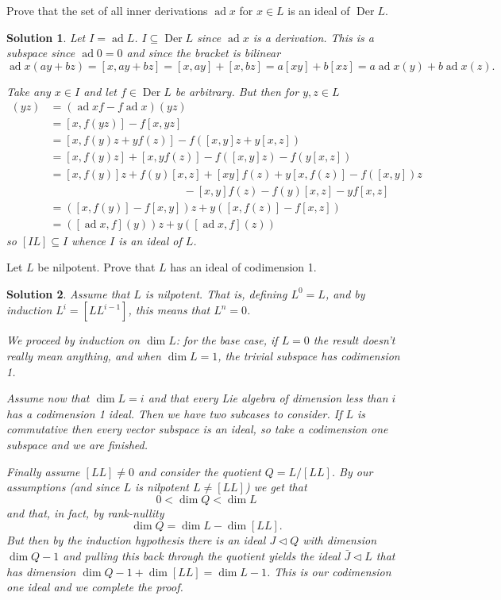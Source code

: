 \documentclass[12pt]{article}
\newenvironment{hwprob}[1]
{\renewcommand{\theprob}{#1}%
 \addtocounter{thm}{-1}%
 \begin{prob}}
{\end{prob}}
\theoremstyle{nonumberbreak}
\newtheorem{sol}{Solution}
\theoremstyle{changebreak}
\theoremstyle{nonumberbreak}
\theoremstyle{change}
\DeclareMathOperator{\ad}{ad}
\DeclareMathOperator{\Der}{Der}
\begin{document}
\begin{hwprob}{2.1}
	Prove that the set of all inner derivations $\ad x$ for $x\in L$ is an ideal of $\Der L$.
\end{hwprob}
\begin{sol}
	Let $I=\ad L$. $I\subseteq \Der L$ since $\ad x$ is a derivation. This is a subspace since $\ad 0=0$ and since the bracket is bilinear
	\[\ad x(ay+bz)=[x,ay+bz]=[x,ay]+[x,bz]=a[xy]+b[xz]=a\ad x(y)+b\ad x(z).\]

	Take any $x\in I$ and let $f\in\Der L$ be arbitrary. But then for $y,z\in L$
	\begin{align*}
		[\ad x,f](yz)&=(\ad x f-f\ad x)(yz)\\
		&=[x,f(yz)]-f[x,yz]\\
		&=[x,f(y)z+yf(z)]-f([x,y]z+y[x,z])\\
		&=[x,f(y)z]+[x,yf(z)]-f([x,y]z)-f(y[x,z])\\
		&=[x,f(y)]z+f(y)[x,z]+[xy]f(z)+y[x,f(z)]-f([x,y])z\\
		&\hspace{2in} -[x,y]f(z)-f(y)[x,z]-yf[x,z]\\
		&=([x,f(y)]-f[x,y])z+y([x,f(z)]-f[x,z])\\
		&=([\ad x, f](y))z+y([\ad x,f](z))
	\end{align*}
	so $[IL]\subseteq I$ whence $I$ is an ideal of $L$.
\end{sol}

\begin{hwprob}{3.8}
	Let $L$ be nilpotent. Prove that $L$ has an ideal of codimension 1.
\end{hwprob}
\begin{sol}
	Assume that $L$ is nilpotent. That is, defining $L^0=L$, and by induction $L^i=[LL^{i-1}]$, this 
	means that $L^n=0$. 
	
	We proceed by induction on $\dim L$: for the base case, if $L=0$ the result doesn't really mean anything,
	and when $\dim L=1$, the trivial subspace has codimension 1.

	Assume now that $\dim L=i$ and that every Lie algebra of dimension less than $i$ has a codimension 1 ideal. 
	Then we have two subcases to consider. If $L$ is commutative then
	every vector subspace is an ideal, so take a codimension one subspace and we are finished.
	
	Finally assume $[LL]\ne 0$ and consider the quotient $Q=L/[LL]$. By 
	our assumptions (and since $L$ is nilpotent $L\ne[LL]$) we get that
	\[0<\dim Q<\dim L\]
	and that, in fact, by rank-nullity
	\[\dim Q = \dim L - \dim[LL].\]
	But then by the induction hypothesis there is an ideal $J\lhd Q$ with dimension $\dim Q - 1$
	and pulling this back through the quotient yields the ideal $\bar J\lhd L$ that has dimension $\dim Q-1+\dim[LL]=\dim L-1$. 
	This is our codimension one ideal and we complete the proof.
\end{sol}
\end{document}
